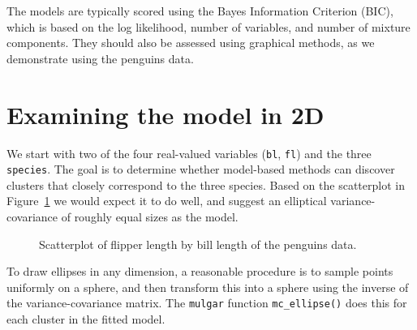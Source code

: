 \documentclass[
  letterpaper,
]{krantz}
\begin{document}

The models are typically scored using the Bayes Information Criterion
(BIC), which is based on the log likelihood, number of variables, and
number of mixture components. They should also be assessed using
graphical methods, as we demonstrate using the penguins data.

\section{Examining the model in 2D}\label{examining-the-model-in-2d}

We start with two of the four real-valued variables (\texttt{bl},
\texttt{fl}) and the three \texttt{species}. The goal is to determine
whether model-based methods can discover clusters that closely
correspond to the three species. Based on the scatterplot in
Figure~\ref{fig-penguins-bl-fl} we would expect it to do well, and
suggest an elliptical variance-covariance of roughly equal sizes as the
model.

\begin{figure}


\caption{\label{fig-penguins-bl-fl}Scatterplot of flipper length by bill
length of the penguins data.}

\end{figure}%

To draw ellipses in any dimension, a reasonable procedure is to sample
points uniformly on a sphere, and then transform this into a sphere
using the inverse of the variance-covariance matrix. The \texttt{mulgar}
function \texttt{mc\_ellipse()} does this for each cluster in the fitted
model.

\end{document}
